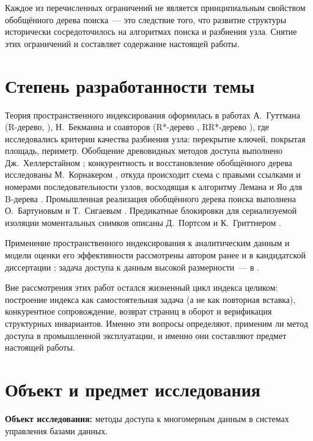 Каждое из перечисленных ограничений не является принципиальным свойством
обобщённого дерева поиска~--- это следствие того, что развитие структуры
исторически сосредоточилось на алгоритмах поиска и разбиения узла. Снятие этих
ограничений и составляет содержание настоящей работы.

\section*{Степень разработанности темы}

Теория пространственного индексирования оформилась в работах А.~Гуттмана
(R-дерево, \cite{guttman1984r}), Н.~Бекманна и соавторов (R*-дерево
\cite{beckmann1990rstar}, RR*-дерево \cite{beckmann2009rrstar}), где
исследовались критерии качества разбиения узла: перекрытие ключей, покрытая
площадь, периметр. Обобщение древовидных методов доступа выполнено
Дж.~Хеллерстайном \cite{hellerstein1995generalized}; конкурентность и
восстановление обобщённого дерева исследованы М.~Корнакером
\cite{kornacker1997concurrency}, откуда происходит схема с правыми ссылками и
номерами последовательности узлов, восходящая к алгоритму Лемана и Яо для
B-дерева \cite{lehman1981btree}. Промышленная реализация обобщённого дерева
поиска выполнена О.~Бартуновым и Т.~Сигаевым \cite{chilingarian2004postgresql}.
Предикатные блокировки для сериализуемой изоляции моментальных снимков описаны
Д.~Портсом и К.~Гриттнером \cite{ports2012ssi}.

Применение пространственного индексирования к аналитическим данным и модели
оценки его эффективности рассмотрены автором ранее
\cite{borodin2008tpu,borodin2011estimation,borodin2011parallel,borodin2012monograph}
и в кандидатской диссертации \cite{borodin2011thesis}; задача доступа к данным
высокой размерности~--- в \cite{borodin2016highd}.

Вне рассмотрения этих работ остался жизненный цикл индекса целиком:
построение индекса как самостоятельная задача (а не как повторная вставка),
конкурентное сопровождение, возврат страниц в оборот и верификация структурных
инвариантов. Именно эти вопросы определяют, применим ли метод доступа в
промышленной эксплуатации, и именно они составляют предмет настоящей работы.

\section*{Объект и предмет исследования}

\textbf{Объект исследования:} методы доступа к многомерным данным в системах
управления базами данных.

